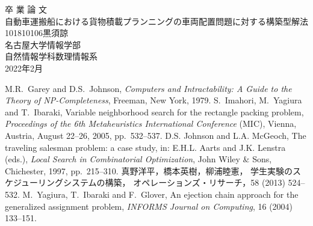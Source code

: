 \documentclass[platex]{jreport}
\begin{document}
\begin{table}[b]
\begin{center}
{\huge 卒\hspace{0.1cm} 業\hspace{0.1cm} 論\hspace{0.1cm} 文}\\[2.5cm]
{\huge 自動車運搬船における貨物積載プランニングの車両配置問題に対する構築型解法}\\[6cm]
{\huge 101810106\qquad 黒須諒}\\[1cm]
{\huge 名古屋大学情報学部}\\[0.5cm]
{\huge 自然情報学科数理情報系}\\[0.5cm]
{\huge 2022年2月}\\
\end{center}
\end{table} 


\thispagestyle{empty} 
\clearpage
\newpage
{}
\setcounter{page}{1}



% 



\thispagestyle{empty} 
\tableofcontents
\newpage
\setcounter{page}{1}
\pagestyle{plain}







% 







\begin{thebibliography}{99}
	 M.R.~Garey and D.S.~Johnson,
		{\it Computers and Intractability: A Guide to the Theory of NP-Completeness},
		Freeman, New York, 1979.
	 S.~Imahori, M.~Yagiura and T.~Ibaraki,
		Variable neighborhood search for the rectangle packing problem,
		{\it Proceedings of the 6th Metaheuristics International Conference} (MIC),
		Vienna, Austria, August 22--26, 2005, pp.~532--537.
	 D.S. Johnson and L.A. McGeoch,
		The traveling salesman problem: a case study,
		in: E.H.L. Aarts and J.K. Lenstra (eds.),
		{\it Local Search in Combinatorial Optimization},
		John Wiley \& Sons, Chichester, 1997, pp.~215--310.
	 真野洋平，橋本英樹，柳浦睦憲，
		学生実験のスケジューリングシステムの構築，
		オペレーションズ・リサーチ，58 (2013) 524--532.
	 M.~Yagiura, T.~Ibaraki and F.~Glover, 
		An ejection chain approach for the generalized assignment problem,
		{\it INFORMS Journal on Computing}, 16 (2004) 133--151.
\end{thebibliography}
\end{document}
